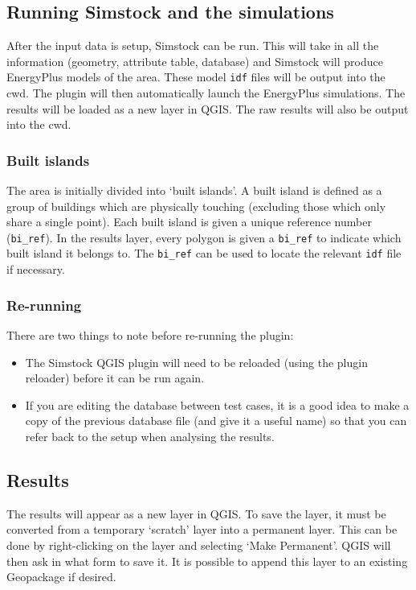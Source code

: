\documentclass{article}
\begin{document}
\subsection{Running Simstock and the simulations}
After the input data is setup, Simstock can be run. This will take in all the information (geometry, attribute table, database) and Simstock will produce EnergyPlus models of the area. These model \texttt{idf} files will be output into the cwd. The plugin will then automatically launch the EnergyPlus simulations. The results will be loaded as a new layer in QGIS. The raw results will also be output into the cwd.

\subsubsection{Built islands}
The area is initially divided into `built islands'. A built island is defined as a group of buildings which are physically touching (excluding those which only share a single point). Each built island is given a unique reference number (\texttt{bi\_ref}). In the results layer, every polygon is given a \texttt{bi\_ref} to indicate which built island it belongs to. The \texttt{bi\_ref} can be used to locate the relevant \texttt{idf} file if necessary.

\subsubsection{Re-running}
There are two things to note before re-running the plugin:
\begin{itemize}
    \item The Simstock QGIS plugin will need to be reloaded (using the plugin reloader) before it can be run again.
    \item If you are editing the database between test cases, it is a good idea to make a copy of the previous database file (and give it a useful name) so that you can refer back to the setup when analysing the results.
\end{itemize}

\subsection{Results}
The results will appear as a new layer in QGIS. To save the layer, it must be converted from a temporary `scratch' layer into a permanent layer. This can be done by right-clicking on the layer and selecting `Make Permanent'. QGIS will then ask in what form to save it. It is possible to append this layer to an existing Geopackage if desired. \\
\end{document}
